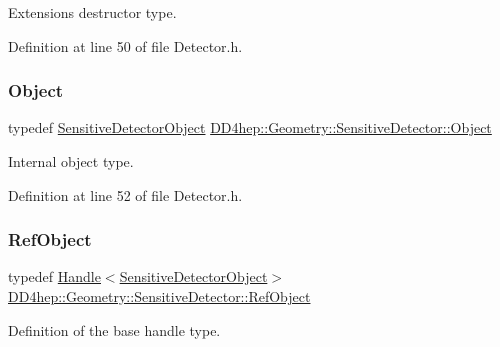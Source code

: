 Extensions destructor type. 



Definition at line 50 of file Detector.\+h.

\hypertarget{class_d_d4hep_1_1_geometry_1_1_sensitive_detector_a0d3dbe95cad52849050e35e70a5cf784}{}\label{class_d_d4hep_1_1_geometry_1_1_sensitive_detector_a0d3dbe95cad52849050e35e70a5cf784} 
\subsubsection{\texorpdfstring{Object}{Object}}
{\footnotesize\ttfamily typedef \hyperlink{class_d_d4hep_1_1_geometry_1_1_sensitive_detector_object}{Sensitive\+Detector\+Object} \hyperlink{class_d_d4hep_1_1_geometry_1_1_sensitive_detector_a0d3dbe95cad52849050e35e70a5cf784}{D\+D4hep\+::\+Geometry\+::\+Sensitive\+Detector\+::\+Object}}



Internal object type. 



Definition at line 52 of file Detector.\+h.

\hypertarget{class_d_d4hep_1_1_geometry_1_1_sensitive_detector_a6283afdc6a1de8128bd6aea54f030014}{}\label{class_d_d4hep_1_1_geometry_1_1_sensitive_detector_a6283afdc6a1de8128bd6aea54f030014} 
\subsubsection{\texorpdfstring{Ref\+Object}{RefObject}}
{\footnotesize\ttfamily typedef \hyperlink{class_d_d4hep_1_1_handle}{Handle}$<$\hyperlink{class_d_d4hep_1_1_geometry_1_1_sensitive_detector_object}{Sensitive\+Detector\+Object}$>$ \hyperlink{class_d_d4hep_1_1_geometry_1_1_sensitive_detector_a6283afdc6a1de8128bd6aea54f030014}{D\+D4hep\+::\+Geometry\+::\+Sensitive\+Detector\+::\+Ref\+Object}}



Definition of the base handle type. 



